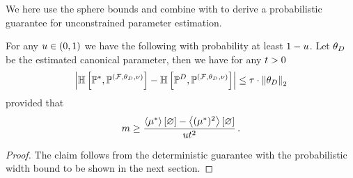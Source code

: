 %
We here use the sphere bounds and combine with  to derive a probabilistic guarantee for unconstrained parameter estimation.

\begin{theorem}
    For any $u\in(0,1)$ we have the following with probability at least $1-u$.
    Let $\theta_{D}$ be the estimated canonical parameter, then we have for any $t>0$
    \[ \left|\mathbb{H}\left[\mathbb{P}^*,\mathbb{P}^{(\mathcal{F},\theta_{D},\nu)}\right] - \mathbb{H}\left[\mathbb{P}^{D},\mathbb{P}^{(\mathcal{F},\theta_{D},\nu)}\right]\right| \leq \tau \cdot \left\|\theta_{D}\right\|_{2} \]
    provided that
    \[ m \geq \frac{\left\langle \mu^*\right\rangle \left[ \varnothing \right]-\left\langle (\mu^*)^2\right\rangle \left[ \varnothing \right]}{u t^2} \, . \]
\end{theorem}
\begin{proof}
    The claim follows from the deterministic guarantee  with the probabilistic width bound  to be shown in the next section.
\end{proof}


